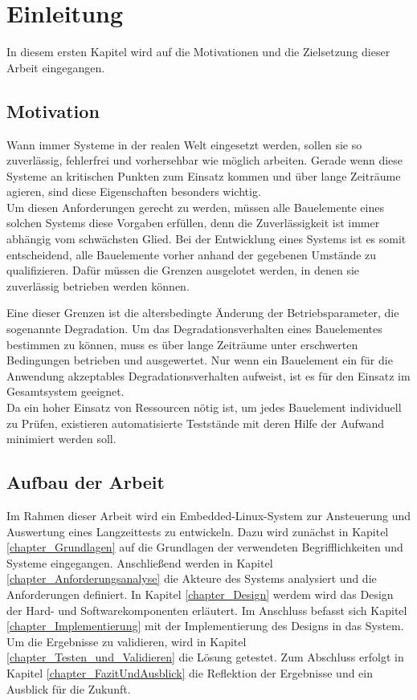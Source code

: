 
\chapter{Einleitung}
\label{chapter_einleitung}
In diesem ersten Kapitel wird auf die Motivationen und die Zielsetzung dieser Arbeit eingegangen.

\section{Motivation}
Wann immer Systeme in der realen Welt eingesetzt werden, sollen sie so zuverlässig, fehlerfrei und vorhersehbar wie möglich arbeiten. Gerade wenn diese Systeme an kritischen Punkten zum Einsatz kommen und über lange Zeiträume agieren, sind diese Eigenschaften besonders wichtig.\\
Um diesen Anforderungen gerecht zu werden, müssen alle Bauelemente eines solchen Systems diese Vorgaben erfüllen, denn die Zuverlässigkeit ist immer abhängig vom schwächsten Glied.
Bei der Entwicklung eines Systems ist es somit entscheidend, alle Bauelemente vorher anhand der gegebenen Umstände zu qualifizieren. Dafür müssen die Grenzen ausgelotet werden, in denen sie zuverlässig betrieben werden können.

Eine dieser Grenzen ist die altersbedingte Änderung der Betriebsparameter, die sogenannte Degradation.
Um das Degradationsverhalten eines Bauelementes bestimmen zu können, muss es über lange Zeiträume unter erschwerten Bedingungen betrieben und ausgewertet. Nur wenn ein Bauelement ein für die Anwendung akzeptables Degradationsverhalten aufweist, ist es für den Einsatz im Gesamtsystem geeignet.\\
Da ein hoher Einsatz von Ressourcen nötig ist, um jedes Bauelement individuell zu Prüfen, existieren automatisierte Teststände mit deren Hilfe der Aufwand minimiert werden soll.
 
\section{Aufbau der Arbeit}

Im Rahmen dieser Arbeit wird ein Embedded-Linux-System zur Ansteuerung und Auswertung eines Langzeittests zu entwickeln. Dazu wird zunächst in Kapitel \ref{chapter_Grundlagen} auf die Grundlagen der verwendeten Begrifflichkeiten und Systeme eingegangen. Anschließend werden in Kapitel \ref{chapter_Anforderungsanalyse} die Akteure des Systems analysiert und die Anforderungen definiert. In Kapitel \ref{chapter_Design} werdem wird das Design der Hard- und Softwarekomponenten erläutert. Im Anschluss befasst sich Kapitel \ref{chapter_Implementierung} mit der Implementierung des Designs in das System. Um die Ergebnisse zu validieren, wird in Kapitel \ref{chapter_Testen_und_Validieren} die Lösung getestet. Zum Abschluss erfolgt in Kapitel \ref{chapter_FazitUndAusblick} die Reflektion der Ergebnisse und ein Ausblick für die Zukunft.